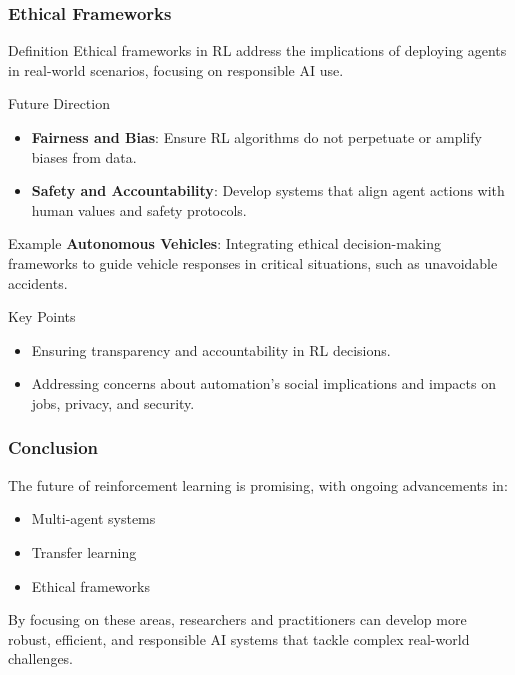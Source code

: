 \documentclass[aspectratio=169]{beamer}
\begin{document}
\begin{frame}[fragile]
    \frametitle{Ethical Frameworks}
    \begin{block}{Definition}
        Ethical frameworks in RL address the implications of deploying agents in real-world scenarios, focusing on responsible AI use.
    \end{block}

    \begin{block}{Future Direction}
        \begin{itemize}
            \item \textbf{Fairness and Bias}: Ensure RL algorithms do not perpetuate or amplify biases from data.
            \item \textbf{Safety and Accountability}: Develop systems that align agent actions with human values and safety protocols.
        \end{itemize}
    \end{block}

    \begin{block}{Example}
        \textbf{Autonomous Vehicles}: Integrating ethical decision-making frameworks to guide vehicle responses in critical situations, such as unavoidable accidents.
    \end{block}

    \begin{block}{Key Points}
        \begin{itemize}
            \item Ensuring transparency and accountability in RL decisions.
            \item Addressing concerns about automation's social implications and impacts on jobs, privacy, and security.
        \end{itemize}
    \end{block}
\end{frame}

\begin{frame}[fragile]
    \frametitle{Conclusion}
    The future of reinforcement learning is promising, with ongoing advancements in:
    \begin{itemize}
        \item Multi-agent systems
        \item Transfer learning
        \item Ethical frameworks
    \end{itemize}
    By focusing on these areas, researchers and practitioners can develop more robust, efficient, and responsible AI systems that tackle complex real-world challenges.
\end{frame}
\end{document}
